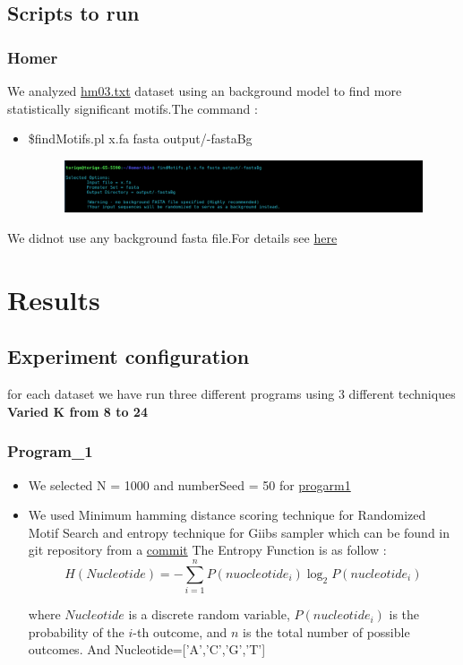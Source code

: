 \documentclass[11pt]{article}
\begin{document}
    \subsection {Scripts to run}
        \subsubsection{Homer}
        We analyzed \href{https://github.com/Superb-Man/Bio-Info/blob/master/data/x.fa}{hm03.txt}
        dataset using an background model to find more statistically significant motifs.The command :
        \begin{itemize}
            \item \$findMotifs.pl x.fa fasta output/-fastaBg
            \begin{figure}[hbt!]
            	\centering
            	\includegraphics[width=0.5\columnwidth]{cmd.png} 
            \end{figure}
        \end{itemize}
        We didnot use any background fasta file.For details see \href{http://homer.ucsd.edu/homer/motif/fasta.html}{here}
\section{Results}
          \subsection{Experiment configuration}
          for each dataset we have run three different programs using 3 different techniques
          \textbf{Varied K from 8 to 24}
              \subsubsection{Program_1}
              \begin{itemize}
                  \item We selected N = 1000 and numberSeed = 50 for \href{https://github.com/Superb-Man/Bio-Info/blob/master/main.ipynb}{progarm1} 
                  \item We used Minimum hamming distance scoring technique for Randomized Motif Search and entropy technique for Giibs sampler which can be found in git repository from a \href{https://github.com/Superb-Man/Bio-Info/commit/92d92fe91373497ff0db6b44b64750403bce8eac}{commit} 
                  The Entropy Function is as follow :
                  \[
                    H(Nucleotide) = -\sum_{i=1}^{n} P(nuocleotide_i) \log_{2} P(nucleotide_i)
                    \]
                    
                    where $Nucleotide$ is a discrete random variable, $P(nucleotide_i)$ is the probability of the $i$-th outcome, and $n$ is the total number of possible outcomes. And
                    Nucleotide=['A','C','G','T']

              \end{itemize}
\end{document}
